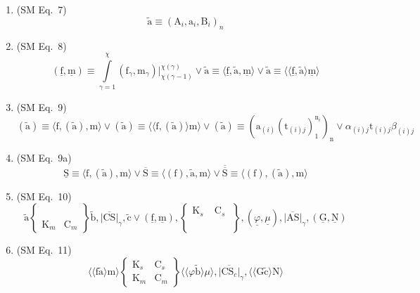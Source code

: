 \documentclass[12pt]{article}
\begin{document}
\begin{enumerate}[label=(\arabic*), series=formellist]
    \item (SM Eq.\ 7) 
    \[
    \tilde{\mathrm{a}} \equiv (\mathrm{A}_i, \mathrm{a}_i, \mathrm{B}_i)_n
    \]

    \item (SM Eq.\ 8) 
    \[
    (\underline{\mathrm{f}}, \underline{\mathrm{m}}) \equiv \int\limits_{\gamma=1}^\chi (\mathrm{f}_\gamma, \mathrm{m}_\gamma) \big|_{\chi(\gamma-1)}^{\chi(\gamma)} \lor \tilde{\mathrm{a}} \equiv \langle \underline{\mathrm{f}}, \tilde{\mathrm{a}}, \underline{\mathrm{m}} \rangle \lor \tilde{\mathrm{a}} \equiv \langle\langle \underline{\mathrm{f}}, \tilde{\mathrm{a}} \rangle \underline{\mathrm{m}} \rangle
    \]

    \item (SM Eq.\ 9) 
    \[
    (\tilde{\mathrm{a}}) \equiv \langle \mathrm{f}, (\tilde{\mathrm{a}}), \mathrm{m} \rangle \lor (\tilde{\mathrm{a}}) \equiv \langle\langle \mathrm{f}, (\tilde{\mathrm{a}}) \rangle \mathrm{m} \rangle \lor (\tilde{\mathrm{a}}) \equiv \left( \mathrm{a}_{(i)}(\mathrm{t}_{(i)j})_1^{\mathrm{n}_i} \right)_\mathrm{n} \lor \alpha_{(i)j} \mathrm{t}_{(i)j} \beta_{(i)j}
    \]

    \item (SM Eq.\ 9a) 
    \[
    \underline{\mathrm{S}} \equiv \langle \mathrm{f}, (\tilde{\mathrm{a}}), \mathrm{m} \rangle \lor \overline{\mathrm{S}} \equiv \langle (\mathrm{f}), \tilde{\mathrm{a}}, \mathrm{m} \rangle \lor \overline{\overline{\mathrm{S}}} \equiv \langle (\mathrm{f}), (\tilde{\mathrm{a}}), \mathrm{m} \rangle
    \]

    \item (SM Eq.\ 10) 
    \[
    \tilde{\mathrm{a}} \left\{ \begin{smallmatrix} \phantom{\mathrm{K}_s} & \phantom{\mathrm{C}_s} \\ \mathrm{K}_m & \mathrm{C}_m \end{smallmatrix} \right\} \tilde{\mathrm{b}}, \overline{|\mathrm{CS}|}_\gamma, \tilde{\mathrm{c}} \lor (\underline{\mathrm{f}}, \underline{\mathrm{m}}), \left\{ \begin{smallmatrix} \mathrm{K}_s & \mathrm{C}_s \\ \phantom{\mathrm{K}_m} & \phantom{\mathrm{C}_m} \end{smallmatrix} \right\}, (\underline{\varphi}, \underline{\mu}), \overline{|\mathrm{AS}|}_\gamma, (\underline{\mathrm{G}}, \underline{\mathrm{N}})
    \]

    \item (SM Eq.\ 11) 
    \[
    \langle\langle \mathrm{f} \tilde{\mathrm{a}} \rangle \mathrm{m} \rangle \left\{ \begin{smallmatrix} \mathrm{K}_s & \mathrm{C}_s \\ \mathrm{K}_m & \mathrm{C}_m \end{smallmatrix} \right\} \langle\langle \varphi \tilde{\mathrm{b}} \rangle \mu \rangle, \overline{|\mathrm{CS}_c|}_\gamma, \langle\langle \mathrm{G} \tilde{\mathrm{c}} \rangle \mathrm{N} \rangle
    \]


\end{enumerate}
\end{document}

